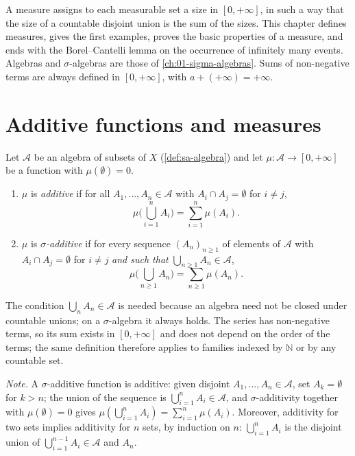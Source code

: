 
A measure assigns to each measurable set a size in $[0,+\infty]$, in such a way that the size
of a countable disjoint union is the sum of the sizes. This chapter defines measures, gives
the first examples, proves the basic properties of a measure, and ends with the
Borel--Cantelli lemma on the occurrence of infinitely many events. Algebras and
$\sigma$-algebras are those of \cref{ch:01-sigma-algebras}. Sums of non-negative terms are
always defined in $[0,+\infty]$, with $a+(+\infty)=+\infty$.

\section{Additive functions and measures}\label{sec:ms-measures}

\begin{definition}\label{def:ms-additive}
Let $\mathcal A$ be an algebra of subsets of $X$ (\cref{def:sa-algebra}) and let
$\mu:\mathcal A\to[0,+\infty]$ be a function with $\mu(\emptyset)=0$.
\begin{enumerate}[label=(\roman*)]
  \item $\mu$ is \emph{additive} if for all $A_1,\dots,A_n\in\mathcal A$ with
    $A_i\cap A_j=\emptyset$ for $i\ne j$,
    \[
      \mu\Big(\bigcup_{i=1}^nA_i\Big)=\sum_{i=1}^n\mu(A_i).
    \]
  \item $\mu$ is \emph{$\sigma$-additive} if for every sequence $(A_n)_{n\ge1}$ of elements of
    $\mathcal A$ with $A_i\cap A_j=\emptyset$ for $i\ne j$ \emph{and such that}
    $\bigcup_{n\ge1}A_n\in\mathcal A$,
    \[
      \mu\Big(\bigcup_{n\ge1}A_n\Big)=\sum_{n\ge1}\mu(A_n).
    \]
\end{enumerate}
\end{definition}

The condition $\bigcup_nA_n\in\mathcal A$ is needed because an algebra need not be closed
under countable unions; on a $\sigma$-algebra it always holds. The series has non-negative
terms, so its sum exists in $[0,+\infty]$ and does not depend on the order of the terms; the
same definition therefore applies to families indexed by $\mathbb N$ or by any countable set.

\emph{Note.} A $\sigma$-additive function is additive: given disjoint
$A_1,\dots,A_n\in\mathcal A$, set $A_k=\emptyset$ for $k>n$; the union of the sequence is
$\bigcup_{i=1}^nA_i\in\mathcal A$, and $\sigma$-additivity together with $\mu(\emptyset)=0$
gives $\mu(\bigcup_{i=1}^nA_i)=\sum_{i=1}^n\mu(A_i)$. Moreover, additivity for two sets
implies additivity for $n$ sets, by induction on $n$: $\bigcup_{i=1}^nA_i$ is the disjoint
union of $\bigcup_{i=1}^{n-1}A_i\in\mathcal A$ and $A_n$.


